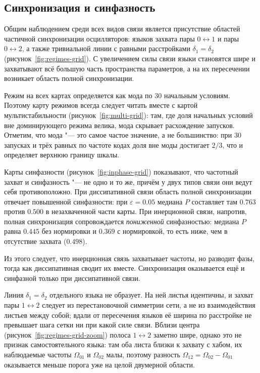 \subsection{Синхронизация и синфазность}

Общим наблюдением среди всех видов связи является присутствие областей частичной
синхронизации осцилляторов: языков захвата пары $0\leftrightarrow 1$ и пары
$0\leftrightarrow 2$, а также тривиальной линии с равными расстройками
$\delta_1 = \delta_2$ (рисунок~\ref{fig:regimes-grid}). С увеличением силы связи языки
становятся шире и захватывают всё большую часть пространства параметров, а на их
пересечении возникает область полной синхронизации.

Режим на всех картах определяется как мода по 30 начальным условиям. Поэтому карту
режимов всегда следует читать вместе с картой мультистабильности
(рисунок~\ref{fig:multi-grid}): там, где доля начальных условий вне доминирующего режима
велика, мода скрывает расхождение запусков. Отметим, что мода "--- это самое частое
значение, а не большинство: при 30 запусках и трёх равных по частоте кодах доля вне моды
достигает $2/3$, что и определяет верхнюю границу шкалы.

Карты синфазности (рисунок~\ref{fig:inphase-grid}) показывают, что частотный захват и
синфазность "--- не одно и то же, причём у двух типов связи они ведут себя противоположно.
При диссипативной связи область полной синхронизации отвечает повышенной синфазности:
при $\varepsilon = 0.05$ медиана $P$ составляет там $0.763$ против $0.500$ в незахваченной
части карты. При инерционной связи, напротив, полная синхронизация сопровождается
\emph{пониженной} синфазностью: медиана $P$ равна $0.445$ без нормировки и $0.369$ с
нормировкой, то есть ниже, чем в отсутствие захвата ($0.498$).

Из этого следует, что инерционная связь захватывает частоты, но разводит фазы, тогда как
диссипативная сводит их вместе. Синхронизация оказывается ещё и синфазной только при
диссипативной связи.

Линия $\delta_1 = \delta_2$ отдельного языка не образует. На ней листья идентичны, и
захват пары $1\leftrightarrow 2$ следует из перестановочной симметрии сети, а не из
взаимодействия листьев между собой; вдали от пересечения языков её ширина по расстройке
не превышает шага сетки ни при какой силе связи. Вблизи центра
(рисунок~\ref{fig:regimes-grid-zoom}) полоса $1\leftrightarrow 2$ заметно шире, однако это не
признак самостоятельного языка: там оба листа близки к захвату с хабом, их наблюдаемые
частоты $\Omega_{01}$ и $\Omega_{02}$ малы, поэтому разность
$\Omega_{12} = \Omega_{02} - \Omega_{01}$ оказывается меньше порога уже на целой двумерной
области.

